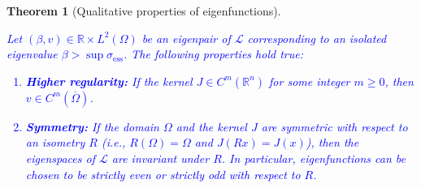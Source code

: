 \documentclass[12pt, a4paper]{article}
\newcommand{\revision}[1]{\textcolor{blue}{#1}}
\theoremstyle{break}
\newtheorem{thm}{Theorem}[section]
\theoremstyle{break}
\theoremstyle{break}
\theoremstyle{break}
\theoremstyle{break}
\theoremstyle{break}
\theoremstyle{break}
\theoremstyle{break}
\theoremstyle{break}
\begin{document}
\begin{thm}[Qualitative properties of eigenfunctions]
    \label{thm:eigenfunction_properties}
    \revision{Let $(\beta, v) \in \mathbb{R} \times L^2(\Omega)$ be an eigenpair of $\mathcal{L}$ corresponding to an isolated eigenvalue $\beta > \sup \sigma_{\mathrm{ess}}$. The following properties hold true:
    \begin{enumerate}
        \item \textbf{Higher regularity:} If the kernel $J \in C^m(\mathbb{R}^n)$ for some integer $m \ge 0$, then $v \in C^m(\overline{\Omega})$.
        \item \textbf{Symmetry:} If the domain $\Omega$ and the kernel $J$ are symmetric with respect to an isometry $R$ (i.e., $R(\Omega) = \Omega$ and $J(Rx) = J(x)$), then the eigenspaces of $\mathcal{L}$ are invariant under $R$. In particular, eigenfunctions can be chosen to be strictly even or strictly odd with respect to $R$.
    \end{enumerate}}
\end{thm}
\end{document}
